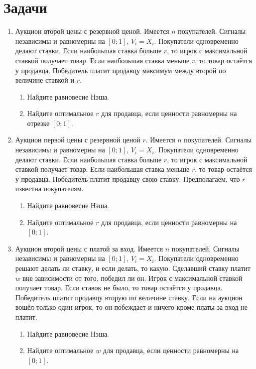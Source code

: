 \section{Задачи}
\begin{enumerate}
\item Аукцион второй цены с резервной ценой. Имеется $n$ покупателей.  Сигналы независимы и равномерны на $ [0;1] $, $ V_{i}=X_{i} $. Покупатели одновременно делают ставки. Если наибольшая ставка больше $ r $, то игрок с максимальной ставкой получает товар. Если наибольшая ставка меньше $ r $, то товар остаётся у продавца. Победитель платит продавцу максимум между второй по величине ставкой и $r$.
\begin{enumerate}
\item Найдите равновесие Нэша.
\item Найдите оптимальное $ r $ для продавца, если ценности равномерны на отрезке $ [0;1] $.
\end{enumerate}


\item Аукцион первой цены с резервной ценой $ r $. Имеется $ n $ покупателей.  Сигналы независимы и равномерны на $ [0;1] $, $ V_{i}=X_{i} $. Покупатели одновременно делают ставки. Если наибольшая ставка больше $ r $, то игрок с максимальной ставкой получает товар. Если наибольшая ставка меньше $ r $, то товар остаётся у продавца. Победитель платит продавцу свою ставку. Предполагаем, что $ r $ известна покупателям.
\begin{enumerate}
\item Найдите равновесие Нэша.
\item Найдите оптимальное $ r $ для продавца, если ценности равномерны на $ [0;1] $.
\end{enumerate}


\item Аукцион второй цены с платой за вход. Имеется $ n $ покупателей.  Сигналы независимы и равномерны на $ [0;1] $, $ V_{i}=X_{i} $. Покупатели одновременно решают делать ли ставку, и если делать, то какую. Сделавший ставку платит $ w $ вне зависимости от того, победил ли он. Игрок с максимальной ставкой получает товар. Если ставок не было, то товар остаётся у продавца. Победитель платит продавцу вторую по величине ставку. Если на аукцион вошёл только один игрок, то он побеждает и  ничего кроме платы за вход не платит.
\begin{enumerate}
\item Найдите равновесие Нэша.
\item Найдите оптимальное $ w $ для продавца, если ценности равномерны на $ [0;1] $.
\end{enumerate}



\end{enumerate}
